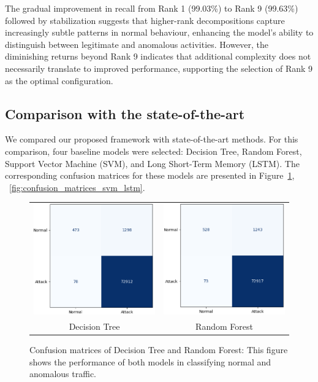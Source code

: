 \documentclass[pdflatex,sn-mathphys-num]{sn-jnl}
\theoremstyle{thmstyleone}
\theoremstyle{thmstyletwo}
\theoremstyle{thmstylethree}
\begin{document}
 The gradual improvement in recall from Rank 1 (99.03\%) to Rank 9 (99.63\%) followed by stabilization suggests that higher-rank decompositions capture increasingly subtle patterns in normal behaviour, enhancing the model's ability to distinguish between legitimate and anomalous activities. However, the diminishing returns beyond Rank 9 indicates that additional complexity does not necessarily translate to improved performance, supporting the selection of Rank 9 as the optimal configuration.   

\subsection{Comparison with the state-of-the-art}

We compared our proposed framework with state-of-the-art methods. For this comparison, four baseline models were selected: Decision Tree, Random Forest, Support Vector Machine (SVM), and Long Short-Term Memory (LSTM). The corresponding confusion matrices for these models are presented in Figure~\ref{fig:confusion_matrices_tree_forest}, ~\ref{fig:confusion_matrices_svm_lstm}.

\begin{figure}[H]
    \centering
    \begin{tabular}{cc}
        \includegraphics[width=0.5\linewidth]{Decision tree.png} &
        \includegraphics[width=0.5\linewidth]{Random Forest.png} \\
        \small Decision Tree & \small Random Forest
    \end{tabular}
    \caption{Confusion matrices of Decision Tree and Random Forest:
This figure shows the performance of both models in classifying normal and anomalous traffic.}
    \label{fig:confusion_matrices_tree_forest}
\end{figure}
\end{document}
